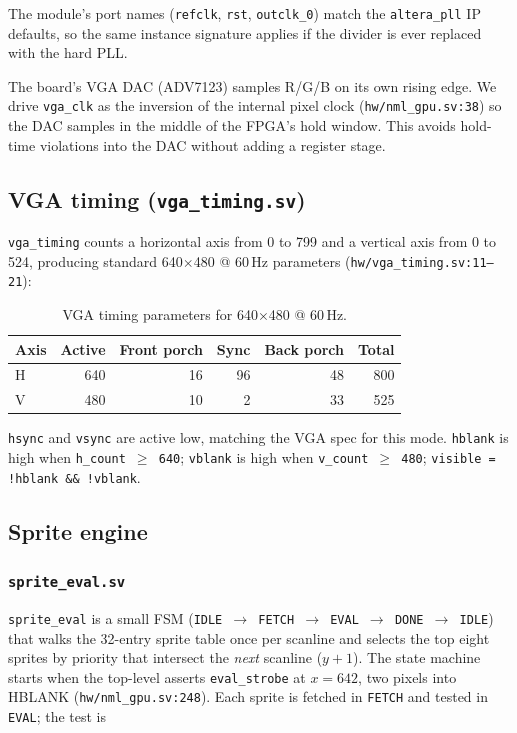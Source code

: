 \documentclass[11pt,letterpaper]{article}
\begin{document}
The module's port names (\texttt{refclk}, \texttt{rst}, \texttt{outclk\_0})
match the \texttt{altera\_pll} IP defaults, so the same instance signature
applies if the divider is ever replaced with the hard PLL.

The board's VGA DAC (ADV7123) samples R/G/B on its own rising edge. We drive
\texttt{vga\_clk} as the inversion of the internal pixel clock
(\texttt{hw/nml\_gpu.sv:38}) so the DAC samples in the middle of the FPGA's
hold window. This avoids hold-time violations into the DAC without adding a
register stage.

\subsection{VGA timing (\texttt{vga\_timing.sv})}

\texttt{vga\_timing} counts a horizontal axis from 0 to 799 and a vertical
axis from 0 to 524, producing standard 640$\times$480 @ 60\,Hz parameters
(\texttt{hw/vga\_timing.sv:11--21}):

\begin{table}[h]
\centering
\begin{tabular}{lrrrrr}
\toprule
Axis & Active & Front porch & Sync & Back porch & Total \\
\midrule
H    & 640    & 16          & 96   & 48         & 800   \\
V    & 480    & 10          & 2    & 33         & 525   \\
\bottomrule
\end{tabular}
\caption{VGA timing parameters for 640$\times$480 @ 60\,Hz.}
\end{table}

\texttt{hsync} and \texttt{vsync} are active low, matching the VGA spec for
this mode. \texttt{hblank} is high when \texttt{h\_count $\geq$ 640};
\texttt{vblank} is high when \texttt{v\_count $\geq$ 480};
\texttt{visible = !hblank \&\& !vblank}.

\subsection{Sprite engine}

\subsubsection{\texttt{sprite\_eval.sv}}

\texttt{sprite\_eval} is a small FSM (\texttt{IDLE $\to$ FETCH $\to$ EVAL
$\to$ DONE $\to$ IDLE}) that walks the 32-entry sprite table once per scanline
and selects the top eight sprites by priority that intersect the \emph{next}
scanline ($y + 1$). The state machine starts when the top-level asserts
\texttt{eval\_strobe} at $x = 642$, two pixels into HBLANK
(\texttt{hw/nml\_gpu.sv:248}). Each sprite is fetched in \texttt{FETCH} and
tested in \texttt{EVAL}; the test is
\end{document}
